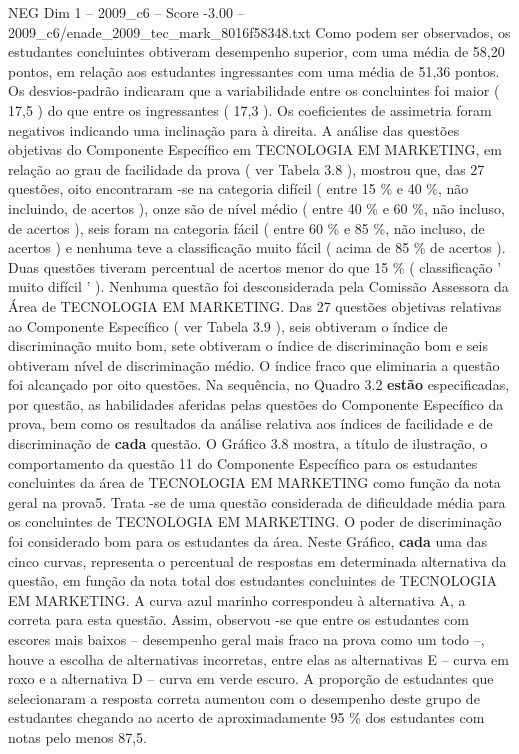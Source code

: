 \begin{textsample}{NEG Dim 1 – 2009\_c6 – Score -3.00 – 2009\_c6/enade\_2009\_tec\_mark\_8016f58348.txt}
Como podem ser observados, os estudantes concluintes obtiveram desempenho superior, com uma média de 58,20 pontos, em relação aos estudantes ingressantes com uma média de 51,36 pontos.
Os desvios-padrão indicaram que a variabilidade entre os concluintes foi maior ( 17,5 ) do que entre os ingressantes ( 17,3 ).
Os coeficientes de assimetria foram negativos indicando uma inclinação para à direita.
A análise das questões objetivas do Componente Específico em TECNOLOGIA EM MARKETING, em relação ao grau de facilidade da prova ( ver Tabela 3.8 ), mostrou que, das 27 questões, oito encontraram -se na categoria difícil ( entre 15 \% e 40 \%, não incluindo, de acertos ), onze são de nível médio ( entre 40 \% e 60 \%, não incluso, de acertos ), seis foram na categoria fácil ( entre 60 \% e 85 \%, não incluso, de acertos ) e nenhuma teve a classificação muito fácil ( acima de 85 \% de acertos ).
Duas questões tiveram percentual de acertos menor do que 15 \% ( classificação ' muito difícil ' ).
Nenhuma questão foi desconsiderada pela Comissão Assessora da Área de TECNOLOGIA EM MARKETING.
Das 27 questões objetivas relativas ao Componente Específico ( ver Tabela 3.9 ), seis obtiveram o índice de discriminação muito bom, sete obtiveram o índice de discriminação bom e seis obtiveram nível de discriminação médio.
O índice fraco que eliminaria a questão foi alcançado por oito questões.
Na sequência, no Quadro 3.2 \textbf{estão} especificadas, por questão, as habilidades aferidas pelas questões do Componente Específico da prova, bem como os resultados da análise relativa aos índices de facilidade e de discriminação de \textbf{cada} questão.
O Gráfico 3.8 mostra, a título de ilustração, o comportamento da questão 11 do Componente Específico para os estudantes concluintes da área de TECNOLOGIA EM MARKETING como função da nota geral na prova5.
Trata -se de uma questão considerada de dificuldade média para os concluintes de TECNOLOGIA EM MARKETING.
O poder de discriminação foi considerado bom para os estudantes da área.
Neste Gráfico, \textbf{cada} uma das cinco curvas, representa o percentual de respostas em determinada alternativa da questão, em função da nota total dos estudantes concluintes de TECNOLOGIA EM MARKETING.
A curva azul marinho correspondeu à alternativa A, a correta para esta questão.
Assim, observou -se que entre os estudantes com escores mais baixos – desempenho geral mais fraco na prova como um todo –, houve a escolha de alternativas incorretas, entre elas as alternativas E – curva em roxo e a alternativa D – curva em verde escuro.
A proporção de estudantes que selecionaram a resposta correta aumentou com o desempenho deste grupo de estudantes chegando ao acerto de aproximadamente 95 \% dos estudantes com notas pelo menos 87,5.

\end{textsample}
